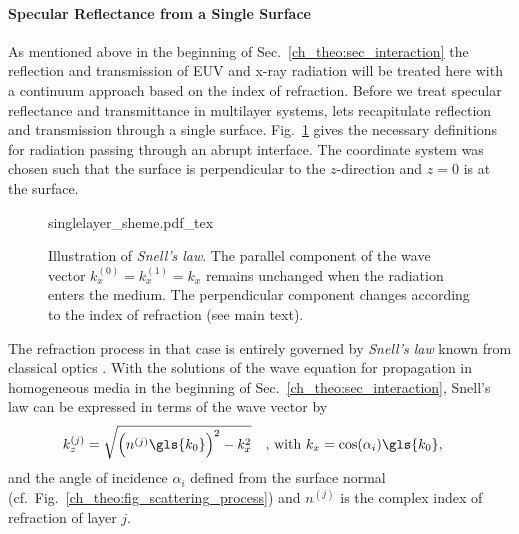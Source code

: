 \paragraph{Specular Reflectance from a Single Surface}
As mentioned above in the beginning of Sec.~\ref{ch_theo:sec_interaction} the reflection and transmission of EUV and x-ray radiation will be treated here with a continuum approach based on the index of refraction. Before we treat specular reflectance and transmittance in multilayer systems, lets recapitulate reflection and transmission through a single surface. Fig.~\ref{ch_theo:fig_singlelayer_scheme} gives the necessary definitions for radiation passing through an abrupt interface. The coordinate system was chosen such that the surface is perpendicular to the $z$-direction and $z=0$ is at the surface.
\begin{figure}[htb]
    \def\svgwidth{0.57\textwidth}
    {singlelayer_sheme.pdf_tex}
    \caption[Illustration of \emph{Snell's law}.]{Illustration of \emph{Snell's law}. The parallel component of the wave vector $k_x^{(0)} = k_x^{(1)} = k_x$ remains unchanged when the radiation enters the medium. The perpendicular component changes according to the index of refraction (see main text).}
    \label{ch_theo:fig_singlelayer_scheme}
\end{figure}
The refraction process in that case is entirely governed by \emph{Snell's law} known from classical optics \cite{born_principles_1965}. With the solutions of the wave equation for propagation in homogeneous media in the beginning of Sec.~\ref{ch_theo:sec_interaction}, Snell's law can be expressed in terms of the wave vector by
\begin{align}
k_z^{(j)} &= \sqrt{\Big(n^{(j)} \gls{k_0}\Big)^2 - k_x^2} \quad \text{, with } k_x = \cos(\alpha_i) \gls{k_0} \text{,} \label{ch_theo:eqn_snells_law}
\end{align}
and the angle of incidence $\alpha_i$ defined from the surface normal (cf.~Fig.~\ref{ch_theo:fig_scattering_process}) and $n^{(j)}$ is the complex index of refraction of layer $j$.

